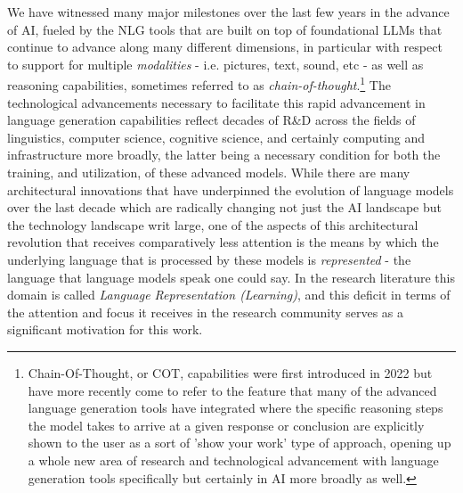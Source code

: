\documentclass[final]{clv2025-revised}
\begin{document}
We have witnessed many major milestones over the last few years in the advance of AI, fueled by the NLG tools that are built on top of foundational LLMs that continue to advance along many different dimensions, in particular with respect to support for multiple \textit{modalities} - i.e. pictures, text, sound, etc - as well as reasoning capabilities, sometimes referred to as \textit{chain-of-thought}.\footnote{Chain-Of-Thought, or COT, capabilities were first introduced in 2022 \cite{articlewei} but have more recently come to refer to the feature that many of the advanced language generation tools have integrated where the specific reasoning steps the model takes to arrive at a given response or conclusion are explicitly shown to the user as a sort of 'show your work' type of approach, opening up a whole new area of research and technological advancement with language generation tools specifically but certainly in AI more broadly as well.} The technological advancements necessary to facilitate this rapid advancement in language generation capabilities reflect decades of R\&D across the fields of linguistics, computer science, cognitive science, and certainly computing and infrastructure more broadly, the latter being a necessary condition for both the training, and utilization, of these advanced models. While there are many architectural innovations that have underpinned the evolution of language models over the last decade which are radically changing not just the AI landscape but the technology landscape writ large, one of the aspects of this architectural revolution that receives comparatively less attention is the means by which the underlying language that is processed by these models is \textit{represented} - the language that language models speak one could say. In the research literature this domain is called \textit{Language Representation (Learning)}, and this deficit in terms of the attention and focus it receives in the research community serves as a significant motivation for this work. 
\end{document}
